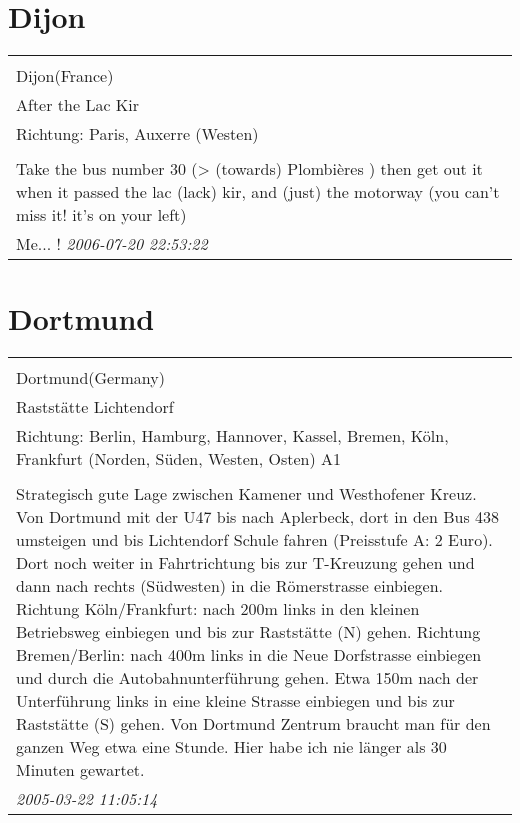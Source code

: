 \documentclass[a4paper,12pt]{article}
\begin{document}
\section{Dijon}
\begin{tabular}{|p{13cm}|}
\hline\\
Dijon(France)\\
After the Lac Kir\\
Richtung: Paris, Auxerre (Westen) \\
\hline\\
Take the bus number 30 (> (towards) Plombières ) then get out it when it passed the lac (lack) kir, and (just) the motorway (you can't miss it! it's on your left) \\
Me... ! \textit{ 2006-07-20 22:53:22 }\\\hline
\end{tabular}


\section{Dortmund}
\begin{tabular}{|p{13cm}|}
\hline\\
Dortmund(Germany)\\
Raststätte Lichtendorf\\
Richtung: Berlin, Hamburg, Hannover, Kassel, Bremen, Köln, Frankfurt (Norden, Süden, Westen, Osten) A1 \\
\hline\\
Strategisch gute Lage zwischen Kamener und Westhofener Kreuz. Von Dortmund mit der U47 bis nach Aplerbeck, dort in den Bus 438 umsteigen und bis Lichtendorf Schule fahren (Preisstufe A: 2 Euro). Dort noch weiter in Fahrtrichtung bis zur T-Kreuzung gehen und dann nach rechts (Südwesten) in die Römerstrasse einbiegen. Richtung Köln/Frankfurt: nach 200m links in den kleinen Betriebsweg einbiegen und bis zur Raststätte (N) gehen. Richtung Bremen/Berlin: nach 400m links in die Neue Dorfstrasse einbiegen und durch die Autobahnunterführung gehen. Etwa 150m nach der Unterführung links in eine kleine Strasse einbiegen und bis zur Raststätte (S) gehen. Von Dortmund Zentrum braucht man für den ganzen Weg etwa eine Stunde. Hier habe ich nie länger als 30 Minuten gewartet. \\
\textit{ 2005-03-22 11:05:14 }\\\hline
\end{tabular}
\end{document}
